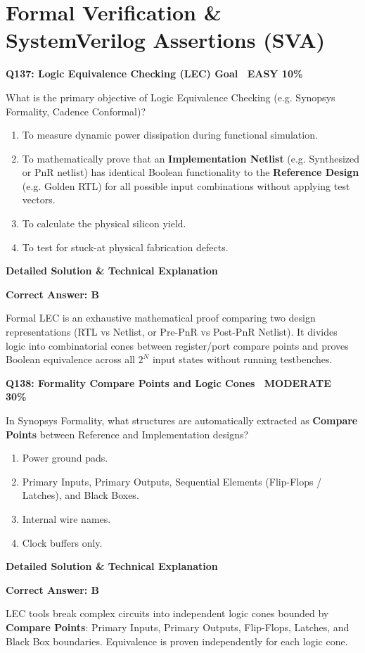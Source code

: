 \documentclass[11pt,a4paper]{article}
\newcommand{\badgemod}{{\color{white}\colorbox{modoran}{\bfseries\sffamily\tiny\ MODERATE 30\%\ }}}
\newcommand{\badgeeasy}{{\color{white}\colorbox{easygreen}{\bfseries\sffamily\tiny\ EASY 10\%\ }}}
\newenvironment{qbox}[2]{%
  \begin{mdframed}[style=qstyle]%
  {\bfseries\sffamily\color{primaryblue}#1 \hfill #2}\par\vspace{2pt}%
}{%
  \end{mdframed}%
}
\newenvironment{ansbox}{%
  \begin{mdframed}[style=ansstyle]%
  {\bfseries\sffamily\color{ansgreen}\small Detailed Solution \& Technical Explanation}\par\vspace{2pt}\small%
}{%
  \end{mdframed}%
}
\begin{document}
\section{Formal Verification \& SystemVerilog Assertions (SVA)}

\begin{qbox}{Q137: Logic Equivalence Checking (LEC) Goal}{\badgeeasy}
What is the primary objective of Logic Equivalence Checking (e.g. Synopsys Formality, Cadence Conformal)?
\begin{enumerate}[label=\textbf{\Alph*.}]
  \item To measure dynamic power dissipation during functional simulation.
  \item To mathematically prove that an \textbf{Implementation Netlist} (e.g. Synthesized or PnR netlist) has identical Boolean functionality to the \textbf{Reference Design} (e.g. Golden RTL) for all possible input combinations without applying test vectors.
  \item To calculate the physical silicon yield.
  \item To test for stuck-at physical fabrication defects.
\end{enumerate}
\end{qbox}
\begin{ansbox}
\textbf{Correct Answer: B}

Formal LEC is an exhaustive mathematical proof comparing two design representations (RTL vs Netlist, or Pre-PnR vs Post-PnR Netlist). It divides logic into combinatorial cones between register/port compare points and proves Boolean equivalence across all $2^N$ input states without running testbenches.
\end{ansbox}

\begin{qbox}{Q138: Formality Compare Points and Logic Cones}{\badgemod}
In Synopsys Formality, what structures are automatically extracted as \textbf{Compare Points} between Reference and Implementation designs?
\begin{enumerate}[label=\textbf{\Alph*.}]
  \item Power ground pads.
  \item Primary Inputs, Primary Outputs, Sequential Elements (Flip-Flops / Latches), and Black Boxes.
  \item Internal wire names.
  \item Clock buffers only.
\end{enumerate}
\end{qbox}
\begin{ansbox}
\textbf{Correct Answer: B}

LEC tools break complex circuits into independent logic cones bounded by \textbf{Compare Points}: Primary Inputs, Primary Outputs, Flip-Flops, Latches, and Black Box boundaries. Equivalence is proven independently for each logic cone.
\end{ansbox}
\end{document}
